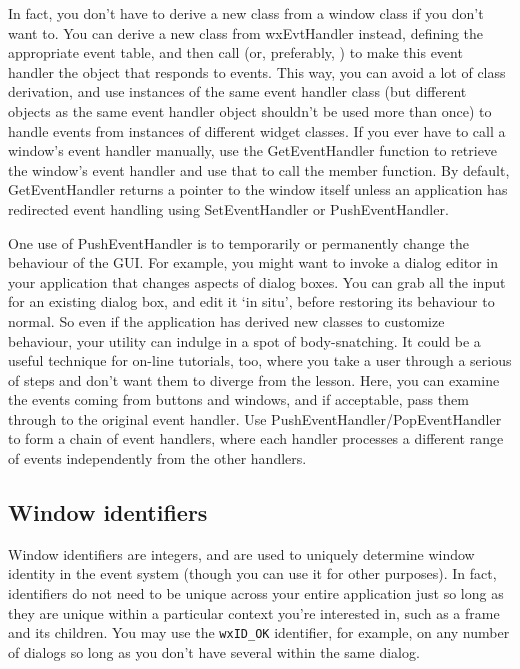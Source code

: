 In fact, you don't have to derive a new class from a window class
if you don't want to. You can derive a new class from wxEvtHandler instead,
defining the appropriate event table, and then call
\rtfsp{} (or, preferably,
\rtfsp{}) to make this
event handler the object that responds to events. This way, you can avoid
a lot of class derivation, and use instances of the same event handler class (but different
objects as the same event handler object shouldn't be used more than once) to
handle events from instances of different widget classes. If you ever have to call a window's event handler
manually, use the GetEventHandler function to retrieve the window's event handler and use that
to call the member function. By default, GetEventHandler returns a pointer to the window itself
unless an application has redirected event handling using SetEventHandler or PushEventHandler.

One use of PushEventHandler is to temporarily or permanently change the
behaviour of the GUI. For example, you might want to invoke a dialog editor
in your application that changes aspects of dialog boxes. You can
grab all the input for an existing dialog box, and edit it `in situ',
before restoring its behaviour to normal. So even if the application
has derived new classes to customize behaviour, your utility can indulge
in a spot of body-snatching. It could be a useful technique for on-line
tutorials, too, where you take a user through a serious of steps and
don't want them to diverge from the lesson. Here, you can examine the events
coming from buttons and windows, and if acceptable, pass them through to
the original event handler. Use PushEventHandler/PopEventHandler
to form a chain of event handlers, where each handler processes a different
range of events independently from the other handlers.

\subsection{Window identifiers}\label{windowids}

Window identifiers are integers, and are used to
uniquely determine window identity in the event system (though you can use it
for other purposes). In fact, identifiers do not need to be unique
across your entire application just so long as they are unique within a
particular context you're interested in, such as a frame and its children. You
may use the {\tt wxID\_OK} identifier, for example, on any number of dialogs so
long as you don't have several within the same dialog.

